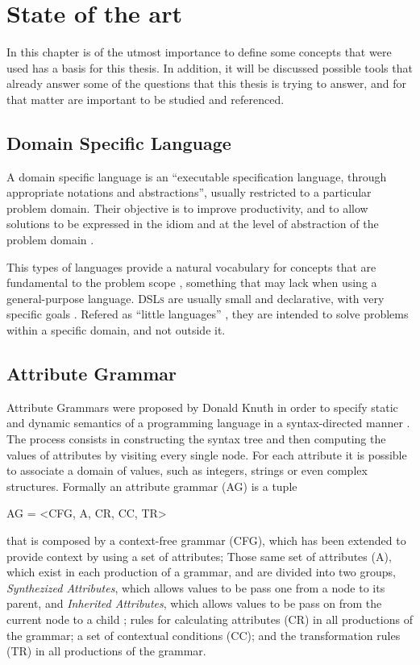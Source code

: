 \chapter{State of the art} \label{state_of_the_art}

In this chapter is of the utmost importance to define some concepts that were used has a basis for this thesis. In addition, it will be discussed possible tools that already answer some of the questions that this thesis is trying to answer, and for that matter are important to be studied and referenced.
	
\section{Domain Specific Language}
A domain specific language is an ``executable specification language, through appropriate notations and abstractions'', usually restricted to a particular problem domain. Their objective is to improve productivity, and to allow solutions to be expressed in the idiom and at the level of abstraction of the problem domain \cite{van_2000}.
	
This types of languages provide a natural vocabulary for concepts that are fundamental to the problem scope \cite{bruce_1997}, something that may lack when using a general-purpose language. \textsc{DSLs} are usually small and declarative, with very specific goals \cite{van_2000}. Refered as ``little languages'' \cite{bentley_1986}, they are intended to solve problems within a specific domain, and not outside it.
	
\section{Attribute Grammar}
Attribute Grammars were proposed by Donald Knuth in order to specify static and dynamic semantics of a programming language in a syntax-directed manner \cite{thirunarayan_2009}. The process consists in constructing the syntax tree and then computing the values of attributes by visiting every single node. For each attribute it is possible to associate a domain of values, such as integers, strings or even complex structures. Formally an attribute grammar (AG) is a tuple \cite{pereira_2016}

AG = \textless CFG, A, CR, CC, TR\textgreater

\noindent that is composed by a context-free grammar (CFG), which has been extended to provide context by using a set of attributes; Those same set of attributes (A), which exist in each production of a grammar, and are divided into two groups, \emph{Synthezized Attributes}, which allows values to be pass one from a node to its parent, and \emph{Inherited Attributes}, which allows values to be pass on from the current node to a child \cite{slonneger_1995}; rules for calculating attributes (CR) in all productions of the grammar; a set of contextual conditions (CC); and the transformation rules (TR) in all productions of the grammar.

